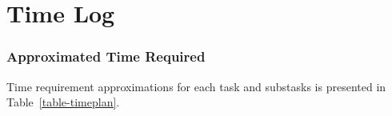 %
%
%
%


\section{Time Log}\label{time-log}


\subsubsection{Approximated Time Required}\label{approximated-time-required}
Time requirement approximations for each task and substasks is presented 
in Table~\ref{table-timeplan}.

